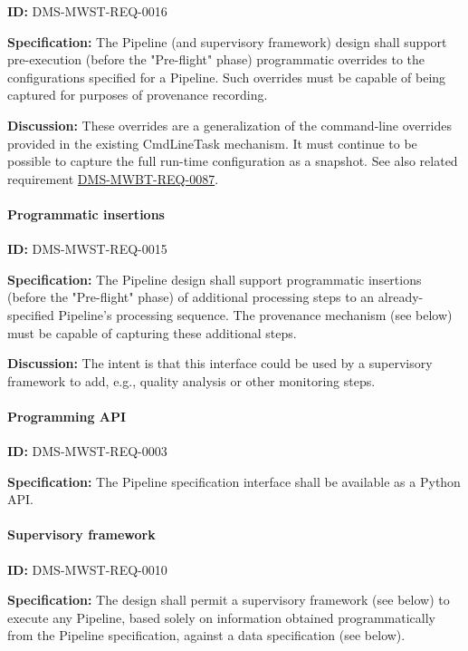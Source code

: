 \documentclass[SE,toc,lsstdraft]{lsstdoc}
\begin{document}
\label{DMS-MWST-REQ-0016}
\textbf{ID:} DMS-MWST-REQ-0016

\textbf{Specification:}
The Pipeline (and supervisory framework) design shall support pre-execution (before the "Pre-flight" phase) programmatic overrides to the configurations specified for a Pipeline. Such overrides must be capable of being captured for purposes of provenance recording.

\textbf{Discussion:}
These overrides are a generalization of the command-line overrides provided in the existing CmdLineTask mechanism. It must continue to be possible to capture the full run-time configuration as a snapshot. See also related requirement \hyperref[DMS-MWBT-REQ-0087]{DMS-MWBT-REQ-0087}.

\paragraph{Programmatic insertions}\hfill  %

\label{DMS-MWST-REQ-0015}
\textbf{ID:} DMS-MWST-REQ-0015

\textbf{Specification:}
The Pipeline design shall support programmatic insertions (before the "Pre-flight" phase) of additional processing steps to an already-specified Pipeline’s processing sequence. The provenance mechanism (see below) must be capable of capturing these additional steps.

\textbf{Discussion:}
The intent is that this interface could be used by a supervisory framework to add, e.g., quality analysis or other monitoring steps.

\paragraph{Programming API}\hfill  %

\label{DMS-MWST-REQ-0003}
\textbf{ID:} DMS-MWST-REQ-0003

\textbf{Specification:}
The Pipeline specification interface shall be available as a Python API.

\paragraph{Supervisory framework}\hfill  %

\label{DMS-MWST-REQ-0010}
\textbf{ID:} DMS-MWST-REQ-0010

\textbf{Specification:}
The design shall permit a supervisory framework (see below) to execute any Pipeline, based solely on information obtained programmatically from the Pipeline specification, against a data specification (see below).
\end{document}
